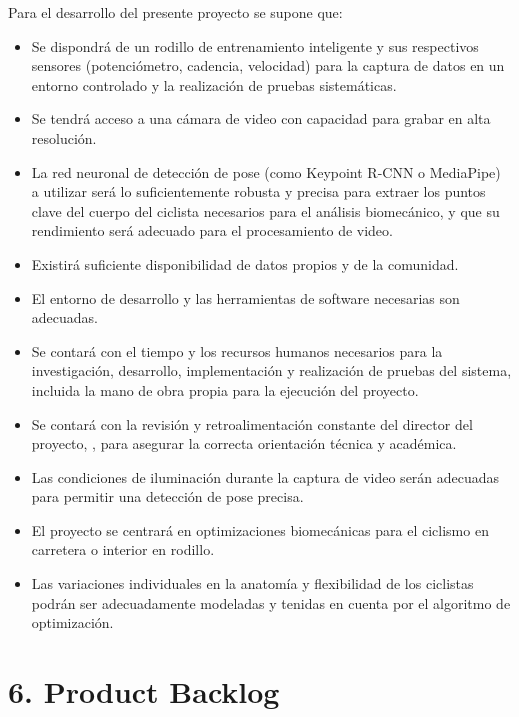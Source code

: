 \documentclass[
11pt, %
]{charter}
\begin{document}
Para el desarrollo del presente proyecto se supone que:
\begin{itemize}
\item Se dispondrá de un rodillo de entrenamiento inteligente y sus respectivos sensores (potenciómetro, cadencia, velocidad) para la captura de datos en un entorno controlado y la realización de pruebas sistemáticas.
\item Se tendrá acceso a una cámara de video con capacidad para grabar en alta resolución.
\item La red neuronal de detección de pose (como Keypoint R-CNN o MediaPipe) a utilizar será lo suficientemente robusta y precisa para extraer los puntos clave del cuerpo del ciclista necesarios para el análisis biomecánico, y que su rendimiento será adecuado para el procesamiento de video.
\item Existirá suficiente disponibilidad de datos propios y de la comunidad.
\item El entorno de desarrollo y las herramientas de software necesarias son adecuadas.
\item Se contará con el tiempo y los recursos humanos necesarios para la investigación, desarrollo, implementación y realización de pruebas del sistema, incluida la mano de obra propia para la ejecución del proyecto.
\item Se contará con la revisión y retroalimentación constante del director del proyecto, \supname	, para asegurar la correcta orientación técnica y académica.
\item Las condiciones de iluminación durante la captura de video serán adecuadas para permitir una detección de pose precisa.
\item El proyecto se centrará en optimizaciones biomecánicas para el ciclismo en carretera o interior en rodillo.
\item Las variaciones individuales en la anatomía y flexibilidad de los ciclistas podrán ser adecuadamente modeladas y tenidas en cuenta por el algoritmo de optimización.
\end{itemize}

\section{6. Product Backlog}
\label{sec:backlog}
\end{document}
